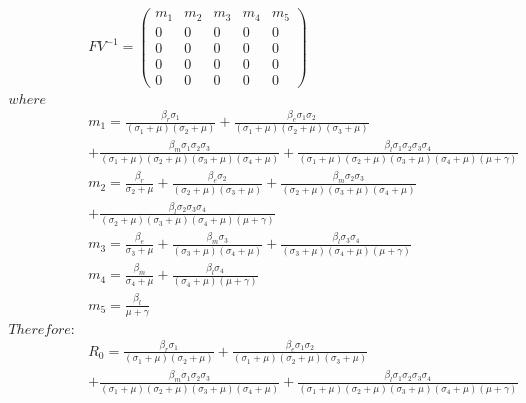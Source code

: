 \begin{align*}
&FV^{-1}= \left(\begin{array}{rrrrr}
m_1 & m_2 & m_3 & m_4 & m_5 \\
0 & 0 & 0 & 0 & 0 \\
0 & 0 & 0 & 0 & 0 \\
0 & 0 & 0 & 0 & 0 \\
0 & 0 & 0 & 0 & 0
\end{array}\right)\\
where \\
&m_1 = \frac{\beta_r \sigma_{1}}{{\left(\sigma_{1} + \mu\right)} {\left(\sigma_{2} + \mu\right)}} + \frac{\beta_e \sigma_{1} \sigma_{2}}{{\left(\sigma_{1} + \mu\right)} {\left(\sigma_{2} + \mu\right)} {\left(\sigma_{3} + \mu\right)}} \\ 
&+ \frac{\beta_m \sigma_{1} \sigma_{2} \sigma_{3}}{{\left(\sigma_{1} + \mu\right)} {\left(\sigma_{2} + \mu\right)} {\left(\sigma_{3} + \mu\right)} {\left(\sigma_{4} + \mu\right)}} + \frac{\beta_l \sigma_{1} \sigma_{2} \sigma_{3} \sigma_{4}}{{\left(\sigma_{1} + \mu\right)} {\left(\sigma_{2} + \mu\right)} {\left(\sigma_{3} + \mu\right)} {\left(\sigma_{4} + \mu\right)} {\left(\mu + \gamma\right)}} \\
&m_2= \frac{\beta_r}{\sigma_{2} + \mu} + \frac{\beta_e \sigma_{2}}{{\left(\sigma_{2} + \mu\right)} {\left(\sigma_{3} + \mu\right)}} + \frac{\beta_m \sigma_{2} \sigma_{3}}{{\left(\sigma_{2} + \mu\right)} {\left(\sigma_{3} + \mu\right)} {\left(\sigma_{4} + \mu\right)}} \\ & + \frac{\beta_l \sigma_{2} \sigma_{3} \sigma_{4}}{{\left(\sigma_{2} + \mu\right)} {\left(\sigma_{3} + \mu\right)} {\left(\sigma_{4} + \mu\right)} {\left(\mu + \gamma\right)}} \\
&m_3= \frac{\beta_e}{\sigma_{3} + \mu} + \frac{\beta_m \sigma_{3}}{{\left(\sigma_{3} + \mu\right)} {\left(\sigma_{4} + \mu\right)}} + \frac{\beta_l \sigma_{3} \sigma_{4}}{{\left(\sigma_{3} + \mu\right)} {\left(\sigma_{4} + \mu\right)} {\left(\mu + \gamma\right)}} \\
&m_4= \frac{\beta_m}{\sigma_{4} + \mu} + \frac{\beta_l \sigma_{4}}{{\left(\sigma_{4} + \mu\right)} {\left(\mu + \gamma\right)}} \\
&m_5= \frac{\beta_l}{\mu + \gamma} \\
Therefore: \\
&R_0 = \frac{\beta_r \sigma_{1}}{{\left(\sigma_{1} + \mu\right)} {\left(\sigma_{2} + \mu\right)}} + \frac{\beta_e \sigma_{1} \sigma_{2}}{{\left(\sigma_{1} + \mu\right)} {\left(\sigma_{2} + \mu\right)} {\left(\sigma_{3} + \mu\right)}} \\ 
&+ \frac{\beta_m \sigma_{1} \sigma_{2} \sigma_{3}}{{\left(\sigma_{1} + \mu\right)} {\left(\sigma_{2} + \mu\right)} {\left(\sigma_{3} + \mu\right)} {\left(\sigma_{4} + \mu\right)}} + \frac{\beta_l \sigma_{1} \sigma_{2} \sigma_{3} \sigma_{4}}{{\left(\sigma_{1} + \mu\right)} {\left(\sigma_{2} + \mu\right)} {\left(\sigma_{3} + \mu\right)} {\left(\sigma_{4} + \mu\right)} {\left(\mu + \gamma\right)}}
\end{align*}
